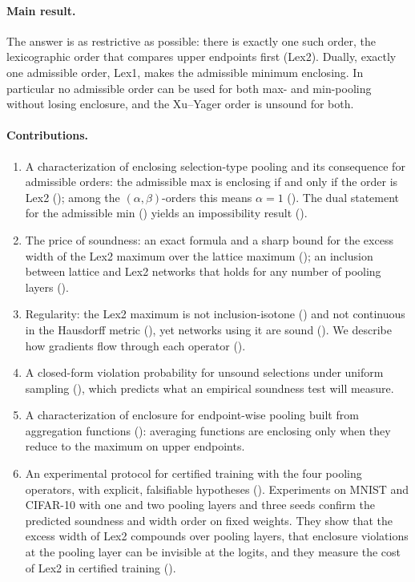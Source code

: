 \paragraph{Main result.} The answer is as restrictive as possible: there is exactly one such order, the lexicographic order that compares upper endpoints first (Lex2). Dually, exactly one admissible order, Lex1, makes the admissible minimum enclosing. In particular no admissible order can be used for both max- and min-pooling without losing enclosure, and the Xu--Yager order \cite{xu2006} is unsound for both.

\paragraph{Contributions.}
\begin{enumerate}[leftmargin=*]
\item A characterization of enclosing selection-type pooling and its consequence for admissible orders: the admissible max is enclosing if and only if the order is Lex2 (); among the $(\alpha,\beta)$-orders this means $\alpha=1$ (). The dual statement for the admissible min () yields an impossibility result ().
\item The price of soundness: an exact formula and a sharp bound for the excess width of the Lex2 maximum over the lattice maximum (); an inclusion between lattice and Lex2 networks that holds for any number of pooling layers ().
\item Regularity: the Lex2 maximum is not inclusion-isotone () and not continuous in the Hausdorff metric (), yet networks using it are sound (). We describe how gradients flow through each operator ().
\item A closed-form violation probability for unsound selections under uniform sampling (), which predicts what an empirical soundness test will measure.
\item A characterization of enclosure for endpoint-wise pooling built from aggregation functions (): averaging functions are enclosing only when they reduce to the maximum on upper endpoints.
\item An experimental protocol for certified training with the four pooling operators, with explicit, falsifiable hypotheses (). Experiments on MNIST and CIFAR-10 with one and two pooling layers and three seeds confirm the predicted soundness and width order on fixed weights. They show that the excess width of Lex2 compounds over pooling layers, that enclosure violations at the pooling layer can be invisible at the logits, and they measure the cost of Lex2 in certified training ().
\end{enumerate}

